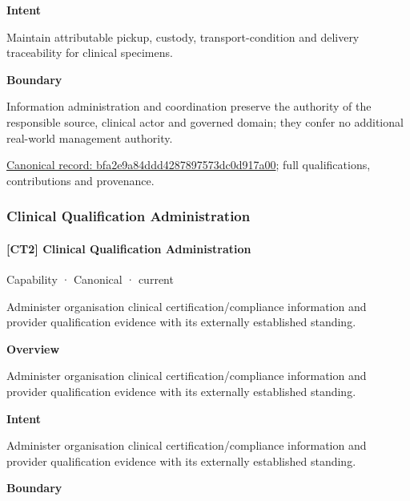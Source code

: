 \textbf{Intent}



Maintain attributable pickup, custody, transport-condition and delivery traceability for clinical specimens.



\textbf{Boundary}



Information administration and coordination preserve the authority of the responsible source, clinical actor and governed domain; they confer no additional real-world management authority.


{\footnotesize \href{../../../../continuum/strategy/capability/bfa2e9a84ddd4287897573dc0d917a00.md}{Canonical record: bfa2e9a84ddd4287897573dc0d917a00}; full qualifications, contributions and provenance.}\par
\subsubsection{Clinical Qualification Administration}

\paragraph{[CT2] Clinical Qualification Administration}

\label{element:0511a705d74a4f48a0ce92590ae764fa}
{\small Capability · Canonical · current}\par

Administer organisation clinical certification/compliance information and provider qualification evidence with its externally established standing.



\textbf{Overview}



Administer organisation clinical certification/compliance information and provider qualification evidence with its externally established standing.



\textbf{Intent}



Administer organisation clinical certification/compliance information and provider qualification evidence with its externally established standing.



\textbf{Boundary}



